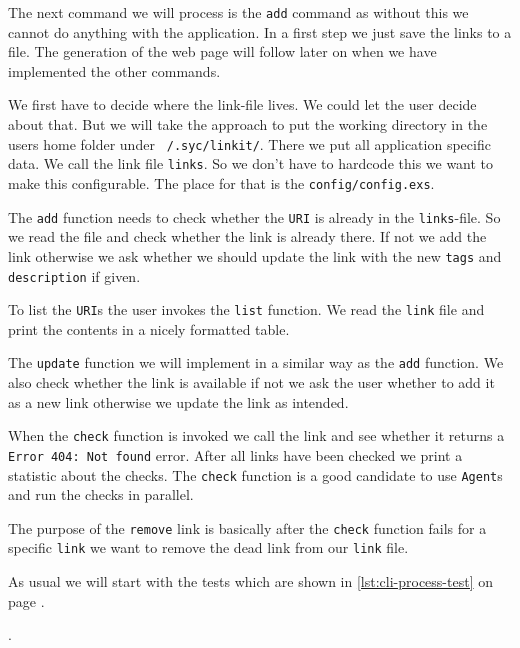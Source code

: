 \documentclass[10pt, a4paper]{article}
\newcommand{\includecode}[3]{}
\begin{document}
The next command we will process is the \texttt{add} command as without this
we cannot do anything with the application. In a first step we just save the
links to a file. The generation of the web page will follow later on when we
have implemented the other commands.

We first have to decide where the link-file lives. We could let the user 
decide about that. But we will take the approach to put the working directory
in the users home folder under \texttt{~/.syc/linkit/}. There we put all
application specific data. We call the link file \texttt{links}. So we don't 
have to hardcode this we want to make this configurable. The place for that is
the \texttt{config/config.exs}. 

\includecode{config/config.exs}{lst:config}{files/config.exs}

The \texttt{add} function needs to check whether the \texttt{URI} is already
in the \texttt{links}-file. So we read the file and check whether the link is
already there. If not we add the link otherwise we ask whether we should update
the link with the new \texttt{tags} and \texttt{description} if given.

To list the \texttt{URI}s the user invokes the \texttt{list} function. We read
the \texttt{link} file and print the contents in a nicely formatted table.

The \texttt{update} function we will implement in a similar way as the 
\texttt{add} function. We also check whether the link is available if not we 
ask the user whether to add it as a new link otherwise we update the link as 
intended.

When the \texttt{check} function is invoked we call the link and see whether it
returns a \texttt{Error 404: Not found} error. After all links have been 
checked we print a statistic about the checks. The \texttt{check} function is a
good candidate to use \texttt{Agent}s and run the checks in parallel.

The purpose of the \texttt{remove} link is basically after the \texttt{check}
function fails for a specific \texttt{link} we want to remove the dead link
from our \texttt{link} file.

As usual we will start with the tests which are shown in 
\ref{lst:cli-process-test} on page \pageref{lst:cli-process-test}.

\includecode{test/cli\_process\_test.exs}{lst:cli-process-test}
            {files/cli_process_test.exs}.
\end{document}

